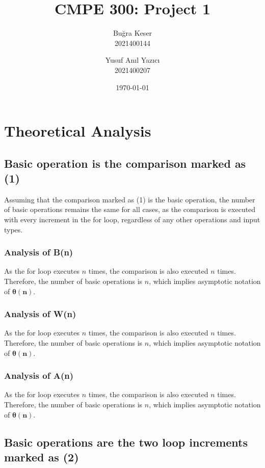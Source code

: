 \documentclass[11pt, oneside, a4paper]{article}
\title{CMPE 300: Project 1}
\author{
	Buğra Keser\\2021400144
	\and
	Yusuf Anıl Yazıcı\\2021400207
}
\date{\today}
\begin{document}
	\maketitle

	\tableofcontents

	\newpage

	\section{Theoretical Analysis}


\subsection{Basic operation is the comparison marked as (1)}
Assuming that the comparison marked as (1) is the basic operation, the number of basic operations remains the same for all cases, as the comparison is executed with every increment in the for loop, regardless of any other operations and input types.

\subsubsection{Analysis of B(n)}
As the for loop executes \( n \) times, the comparison is also executed \( n \) times. Therefore, the number of basic operations is \( n \), which implies asymptotic notation of \(\boldsymbol{\theta(n)}\).

\subsubsection{Analysis of W(n)}
As the for loop executes \( n \) times, the comparison is also executed \( n \) times. Therefore, the number of basic operations is \( n \), which implies asymptotic notation of \(\boldsymbol{\theta(n)}\).

\subsubsection{Analysis of A(n)}
As the for loop executes \( n \) times, the comparison is also executed \( n \) times. Therefore, the number of basic operations is \( n \), which implies asymptotic notation of \(\boldsymbol{\theta(n)}\).


	\subsection{Basic operations are the two loop increments marked as (2)}
\end{document}
